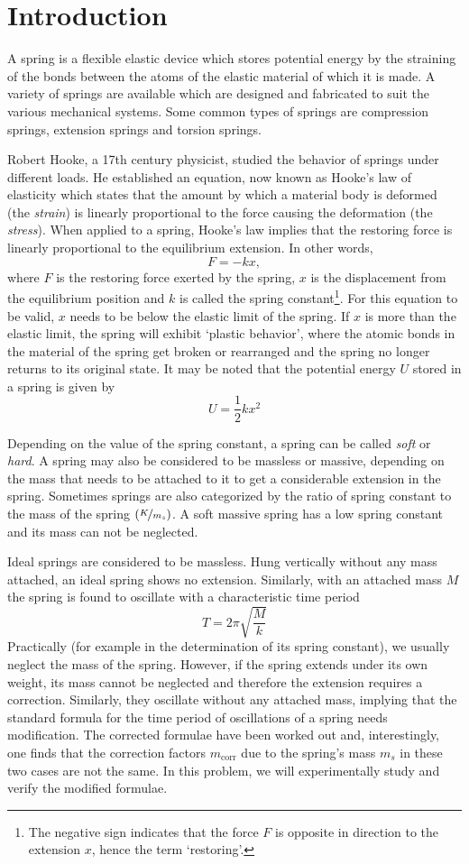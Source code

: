 \section*{Introduction}

A spring is a flexible elastic device which stores potential energy by the straining of the bonds between the atoms of the elastic material of which it is made. A variety of springs are available which are designed and fabricated to suit the various mechanical systems. Some common types of springs are compression springs, extension springs and torsion springs. 

Robert Hooke, a 17th century physicist, studied the behavior of springs under different loads. He established an equation, now known as Hooke’s law of elasticity which states that the amount by which a material body is deformed (the \textit{strain}) is linearly proportional to the force causing the deformation (the \textit{stress}). When applied to a spring, Hooke’s law implies that the restoring force is linearly proportional to the equilibrium extension. In other words,  $$F = - k x,$$ where $F$ is the restoring force exerted by the spring, $x$ is the displacement from the equilibrium position and $k$ is called the spring constant\footnote{The negative sign indicates that the force $F$ is opposite in direction to the extension $x$, hence the term `restoring'.}. For this equation to be valid, $x$ needs to be below the elastic limit of the spring. If $x$ is more than the elastic limit, the spring will exhibit `plastic behavior', where the atomic bonds in the material of the spring get broken or rearranged and the spring no longer returns to its original state. It may be noted that the potential energy $U$ stored in a spring is given by $$U= \frac{1}{2} k x^2$$

Depending on the value of the spring constant, a spring can be called \textit{soft} or \textit{hard}. A spring may also be considered to be massless or massive, depending on the mass that needs to be attached to it to get a considerable extension in the spring. Sometimes springs are also categorized by the ratio of spring constant to the mass of the spring $(\nicefrac{K}{m_s})$. A soft massive spring has a low spring constant and its mass can not be neglected. 

Ideal springs are considered to be massless. Hung vertically without any mass attached, an ideal spring shows no extension. Similarly, with an attached mass $M$ the spring is found to oscillate with a characteristic time period $$T = 2\pi \sqrt{\frac{M}{k}}$$ Practically (for example in the determination of its spring constant), we usually neglect the mass of the spring. However, if the spring extends under its own weight, its mass cannot be neglected and therefore the extension requires a correction. Similarly, they oscillate without any attached mass, implying that the standard formula for the time period of oscillations of a spring needs modification. The corrected formulae have been worked out and, interestingly, one finds that the correction factors $m_\text{corr}$ due to the spring's mass $m_s$ in these two cases are not the same. In this problem, we will experimentally study and verify the modified formulae. 

